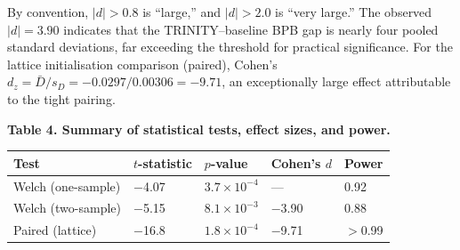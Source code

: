 By convention, \(|d| > 0.8\) is ``large,'' and
\(|d| > 2.0\) is ``very large.'' The observed
\(|d| = 3.90\) indicates that the TRINITY--baseline
BPB gap is nearly four pooled standard deviations,
far exceeding the threshold for practical
significance. For the lattice initialisation
comparison (paired), Cohen's \(d_z = \bar{D}/s_D =
-0.0297/0.00306 = -9.71\), an exceptionally large
effect attributable to the tight pairing.

\textbf{Table 4. Summary of statistical tests,
effect sizes, and power.}

\begin{longtable}[]{@{}lllll@{}}
\toprule\noalign{}
Test & \(t\)-statistic & \(p\)-value &
Cohen's \(d\) & Power \\
\midrule\noalign{}
\endhead
\bottomrule\noalign{}
\endlastfoot
Welch (one-sample) & $-$4.07 & \(3.7 \times 10^{-4}\)
& --- & 0.92 \\
Welch (two-sample) & $-$5.15 & \(8.1 \times 10^{-3}\)
& $-$3.90 & 0.88 \\
Paired (lattice) & $-$16.8 & \(1.8 \times 10^{-4}\)
& $-$9.71 & $>$0.99 \\
\end{longtable}

